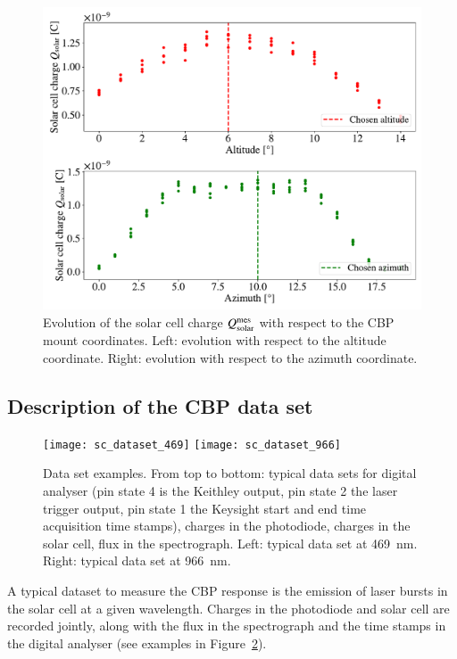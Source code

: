 \begin{figure}[h]
    \centering
    \includegraphics[width=\columnwidth]{fig/cross_solarcell.pdf}
    \caption{Evolution of the solar cell charge $Q_{\mathrm{solar}}^{\mathrm{mes}}$ with respect to the CBP mount coordinates. Left: evolution with respect to the altitude coordinate. Right: evolution with respect to the azimuth coordinate.}
    \label{fig:cross_sc}
\end{figure}


\subsection{Description of the CBP data set}
\label{sec:cbp_datadesc}

\begin{figure}[!h]
\centering
\texttt{[image: sc\_dataset\_469]}
\texttt{[image: sc\_dataset\_966]}
\caption{Data set examples. From top to bottom: typical data sets for digital analyser (pin state 4 is the Keithley output, pin state 2 the laser trigger output, pin state 1 the Keysight start and end time acquisition time stamps), charges in the photodiode, charges in the solar cell, flux in the spectrograph. Left: typical data set at \SI{469}{\nm}. Right: typical data set at \SI{966}{\nm}.}\label{fig:sc_dataset_examples}
\end{figure}

A typical dataset to measure the CBP response is the emission of laser bursts in the solar cell at a given wavelength. Charges in the photodiode and solar cell are recorded jointly, along with the flux in the spectrograph and the time stamps in the digital analyser (see examples in Figure~\ref{fig:sc_dataset_examples}).

